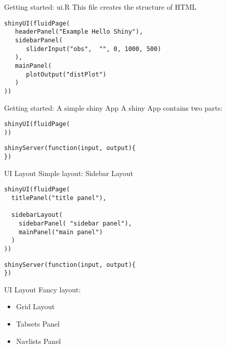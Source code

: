 \documentclass[compress]{beamer}
\begin{document}
\begin{frame}[fragile]{Getting started: ui.R}
This file creates the structure of HTML
\begin{tcolorbox}[colback=green!5,colframe=green!40!black]
\begin{verbatim}
shinyUI(fluidPage(
   headerPanel("Example Hello Shiny"),
   sidebarPanel(
      sliderInput("obs",  "", 0, 1000, 500)
   ),
   mainPanel(
      plotOutput("distPlot")
   )
))
\end{verbatim}
\end{tcolorbox}
\end{frame}

\begin{frame}[fragile]{Getting started: A simple shiny App}
A shiny App contains two parts:
\begin{tcolorbox}[colback=green!5,colframe=green!40!black, title=ui.R]
\begin{verbatim}
shinyUI(fluidPage(
))
\end{verbatim}
\end{tcolorbox}
\begin{tcolorbox}[colback=green!5,colframe=green!40!black, title=server.R]
\begin{verbatim}
shinyServer(function(input, output){
})
\end{verbatim}
\end{tcolorbox}
\end{frame}


\begin{frame}[fragile]{UI Layout}
Simple layout: Sidebar Layout
\begin{tcolorbox}[colback=green!5,colframe=green!40!black, title=ui.R]
\begin{verbatim}
shinyUI(fluidPage(
  titlePanel("title panel"),
  
  sidebarLayout(
    sidebarPanel( "sidebar panel"),
    mainPanel("main panel")
  )
))
\end{verbatim}
\end{tcolorbox}
\begin{tcolorbox}[colback=green!5,colframe=green!40!black, title=server.R]
\begin{verbatim}
shinyServer(function(input, output){
})
\end{verbatim}
\end{tcolorbox}
\end{frame}

\begin{frame}[fragile]{UI Layout}
Fancy layout: 
\begin{tcolorbox}[colback=green!5,colframe=green!40!black]
\begin{itemize}
  \item Grid Layout
  \item Tabsets Panel
  \item Navlists Panel
\end{itemize}
\end{tcolorbox}
\end{frame}
\end{document}
